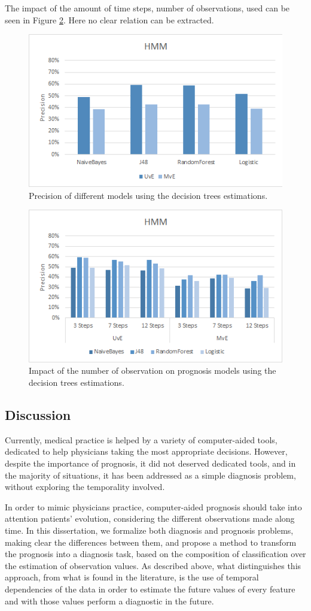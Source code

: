 The impact of the amount of time steps, number of observations, used can be seen in Figure \ref{fig:impactobservationshmm}. Here no clear relation can be extracted.

\begin{figure}[h]
	\centering
	\includegraphics[width=0.49\linewidth]{Figures/precision_h_hmm.png}
	\caption{Precision of different models using the decision trees estimations.}
	\label{fig:precisionhmm}
\end{figure}

\begin{figure}[h]
	\centering
	\includegraphics[width=0.49\linewidth]{Figures/impact_h_hmm.png}
	\caption{Impact of the number of observation on prognosis models using the decision trees estimations.}
	\label{fig:impactobservationshmm}
\end{figure}

\subsection{Discussion}
\label{subsection:discussion}

Currently, medical practice is helped by a variety of computer-aided tools, dedicated to help physicians taking the most
 appropriate decisions. However, despite the importance of prognosis, it did not deserved dedicated tools, and in the majority 
 of situations, it has been addressed as a simple diagnosis problem, without exploring the temporality involved.

In order to mimic physicians practice, computer-aided prognosis should take into attention patients’ evolution, considering the 
different observations made along time. In this dissertation, we formalize both diagnosis and prognosis problems, making clear the
 differences between them, and propose a method to transform the prognosis into a diagnosis task, based on the composition
 of classification over the estimation of observation values. As described above, what distinguishes this approach, from what 
 is found in the literature, is the use of temporal dependencies of the data in order to estimate the future values of every 
 feature and with those values perform a diagnostic in the future. 
 

